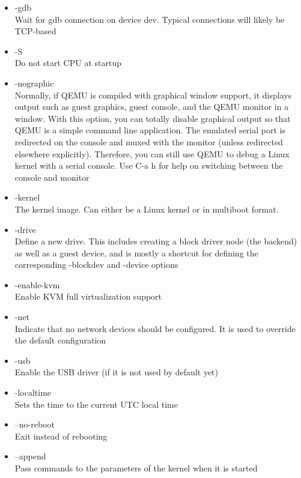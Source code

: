 \documentclass[letterpaper,10pt,fleqn]{article}
\begin{document}
	\begin{itemize}
		\item-gdb\\
					Wait for gdb connection on device dev. Typical connections will likely be TCP-based

		\item-S\\
					Do not start CPU at startup

		\item-nographic\\
           Normally, if QEMU is compiled with graphical window support, it
           displays output such as guest graphics, guest console, and the QEMU
           monitor in a window. With this option, you can totally disable
           graphical output so that QEMU is a simple command line application.
           The emulated serial port is redirected on the console and muxed with
           the monitor (unless redirected elsewhere explicitly). Therefore, you
           can still use QEMU to debug a Linux kernel with a serial console. Use
           C-a h for help on switching between the console and monitor

	  \item-kernel\\
					The kernel image. Can either be a Linux kernel or in multiboot format.

		\item-drive\\
			     Define a new drive. This includes creating a block driver node (the
			     backend) as well as a guest device, and is mostly a shortcut for
			     defining the corresponding -blockdev and -device options

		\item-enable-kvm\\
					Enable KVM full virtualization support

		\item-net\\
					Indicate that no network devices should be configured. It is used to override the default configuration

		\item-usb\\
           Enable the USB driver (if it is not used by default yet)

		\item-localtime\\
					Sets the time to the current UTC local time

		\item--no-reboot\\
					Exit instead of rebooting

		\item--append\\
					Pass commands to the parameters of the kernel when it is started

	\end{itemize}
\end{document}
